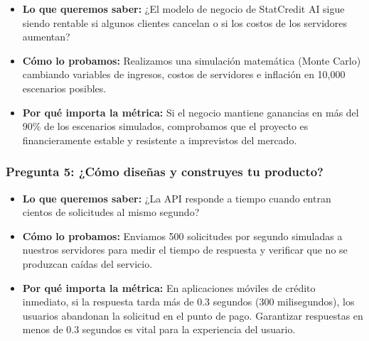 \documentclass[11pt,a4paper]{article}
\begin{document}
\begin{tcolorbox}[colback=lightgray,colframe=secondary,title=\textbf{Experimento 4.2: Simulación de estabilidad financiera (Monte Carlo)}]
\begin{itemize}[leftmargin=*]
    \item \textbf{Lo que queremos saber:} ¿El modelo de negocio de StatCredit AI sigue siendo rentable si algunos clientes cancelan o si los costos de los servidores aumentan?
    \item \textbf{Cómo lo probamos:} Realizamos una simulación matemática (Monte Carlo) cambiando variables de ingresos, costos de servidores e inflación en 10,000 escenarios posibles.
    \item \textbf{Por qué importa la métrica:} Si el negocio mantiene ganancias en más del 90\% de los escenarios simulados, comprobamos que el proyecto es financieramente estable y resistente a imprevistos del mercado.
\end{itemize}
\end{tcolorbox}

\subsubsection{Pregunta 5: ¿Cómo diseñas y construyes tu producto?}

\begin{tcolorbox}[colback=lightgray,colframe=secondary,title=\textbf{Experimento 5.1: Prueba de velocidad y carga del sistema}]
\begin{itemize}[leftmargin=*]
    \item \textbf{Lo que queremos saber:} ¿La API responde a tiempo cuando entran cientos de solicitudes al mismo segundo?
    \item \textbf{Cómo lo probamos:} Enviamos 500 solicitudes por segundo simuladas a nuestros servidores para medir el tiempo de respuesta y verificar que no se produzcan caídas del servicio.
    \item \textbf{Por qué importa la métrica:} En aplicaciones móviles de crédito inmediato, si la respuesta tarda más de 0.3 segundos (300 milisegundos), los usuarios abandonan la solicitud en el punto de pago. Garantizar respuestas en menos de 0.3 segundos es vital para la experiencia del usuario.
\end{itemize}
\end{tcolorbox}
\end{document}
